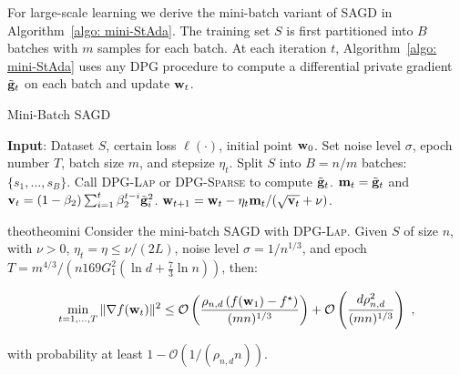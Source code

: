 \documentclass[11pt]{article}
\begin{document}
For large-scale learning we derive the mini-batch variant of \textsc{SAGD} in Algorithm~\ref{algo: mini-StAda}. 
The training set $S$ is first partitioned into $B$ batches with $m$ samples for each batch. 
At each iteration $t$, Algorithm~\ref{algo: mini-StAda} uses any \textsc{DPG} procedure to compute a differential private gradient $\tilde {\mathbf{g}}_t$ on each batch and update $\mathbf{w}_t$. 
\begin{algorithm}[H]
\caption{Mini-Batch \textsc{SAGD}}
\begin{algorithmic}[1] \label{algo: mini-StAda}
\STATE \textbf{Input}: Dataset $S$,  certain loss $\ell(\cdot)$, initial point $\mathbf{w}_0$.
\STATE Set noise level $\sigma$, epoch number $T$,  batch size $m$, and stepsize $\eta_t$.
\STATE Split $S$ into $B=n/m$ batches: $\{ s_1,..., s_B\}$.
\STATE \label{line:dpgmini} Call \textsc{DPG-Lap} or \textsc{DPG-Sparse} to compute $\tilde {\mathbf{g}}_t$.
\STATE \label{line:mini1} $\mathbf{m}_t = \tilde {\mathbf{g}}_t$ and $\mathbf{v}_t = \left(1-\beta_{2}\right) \sum_{i=1}^{t} \beta_{2}^{t-i} \tilde {\mathbf{g}}_{i}^{2}$.
\STATE \label{line:mini2} $\mathbf{w}_{t+1}=\mathbf{w}_{t}-\eta_t \mathbf{m}_t /(\sqrt{\mathbf{v}_t}+\nu)$.
\ENDFOR
\ENDFOR 
\end{algorithmic}
\end{algorithm} \vspace{-0.1in}

\begin{restatable}{theo}{theomini}
\label{thm: main_rmsprop_mini}
Consider the mini-batch \textsc{SAGD} with \textsc{DPG-Lap}. 
Given $S$ of size $n$, with $\nu >0$, $\eta_t = \eta \leq \nu/(2L)$, noise level $\sigma = 1/n^{1/3}$, and epoch $T = m^{4/3}/\left(n169G_1^2(\ln d + \frac{7}{3}\ln n)\right)$, then:
 \begin{small}
\begin{equation*}
\begin{split}
 \min_{t = 1,..., T}\|\nabla f(\mathbf{w}_t)\|^2 
 \leq\mathcal{O} \left( \frac{\rho_{n,d} \left(f(\mathbf{w}_1) - f^\star \right)}{(mn)^{1/3}} \right)+\mathcal{O} \left( \frac{d \rho_{n,d}^2}{(mn)^{1/3}}\right)~,
 \end{split}
\end{equation*}
\end{small}
with probability at least $1-\mathcal{O} \left(1/(\rho_{n,d} n)\right)$.
\end{restatable}
\end{document}
